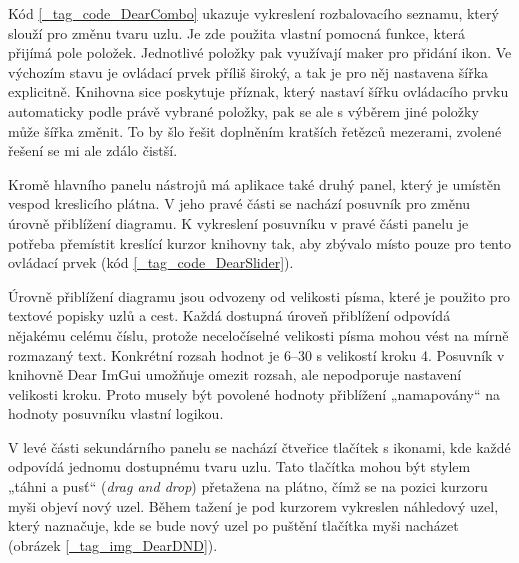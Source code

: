 \documentclass[FM,DP]{tulthesis}
\begin{document}
	Kód \ref{_tag_code_DearCombo} ukazuje vykreslení rozbalovacího seznamu, který slouží pro změnu tvaru uzlu. Je zde použita vlastní pomocná funkce, která přijímá pole položek. Jednotlivé položky pak využívají maker pro přidání ikon. Ve výchozím stavu je ovládací prvek příliš široký, a tak je pro něj nastavena šířka explicitně. Knihovna sice poskytuje příznak, který nastaví šířku ovládacího prvku automaticky podle právě vybrané položky, pak se ale s výběrem jiné položky může šířka změnit. To by šlo řešit doplněním kratších řetězců mezerami, zvolené řešení se mi ale zdálo čistší.
	
	\begin{code}[ht]
		
		\caption{Dear ImGui: rozbalovací seznam s tvarem uzlu}
		\label{_tag_code_DearCombo}
	\end{code}
	
	Kromě hlavního panelu nástrojů má aplikace také druhý panel, který je umístěn vespod kreslicího plátna. V jeho pravé části se nachází posuvník pro změnu úrovně přiblížení diagramu. K vykreslení posuvníku v pravé části panelu je potřeba přemístit kreslící kurzor knihovny tak, aby zbývalo místo pouze pro tento ovládací prvek (kód \ref{_tag_code_DearSlider}).
	
	\begin{code}[ht]
		
		\caption{Dear ImGui: posuvník v pravé části panelu}
		\label{_tag_code_DearSlider}
	\end{code}
	
	Úrovně přiblížení diagramu jsou odvozeny od velikosti písma, které je použito pro textové popisky uzlů a cest. Každá dostupná úroveň přiblížení odpovídá nějakému celému číslu, protože neceločíselné velikosti písma mohou vést na mírně rozmazaný text. Konkrétní rozsah hodnot je 6–30 s velikostí kroku 4. Posuvník v knihovně Dear ImGui umožňuje omezit rozsah, ale nepodporuje nastavení velikosti kroku. Proto musely být povolené hodnoty přiblížení „namapovány“ na hodnoty posuvníku vlastní logikou.
	
	V levé části sekundárního panelu se nachází čtveřice tlačítek s ikonami, kde každé odpovídá jednomu dostupnému tvaru uzlu. Tato tlačítka mohou být stylem „táhni a pusť“ (\textit{drag and drop}) přetažena na plátno, čímž se na pozici kurzoru myši objeví nový uzel. Během tažení je pod kurzorem vykreslen náhledový uzel, který naznačuje, kde se bude nový uzel po puštění tlačítka myši nacházet (obrázek \ref{_tag_img_DearDND}).
	
\end{document}
